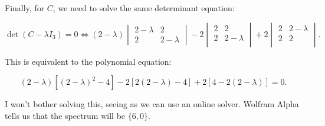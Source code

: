\documentclass{article}
\begin{document}
Finally, for $C$, we need to solve the same determinant equation:

\[
\det(C - \lambda I_3) = 0 \iff (2-\lambda)\begin{vmatrix}
2 - \lambda & 2\\
2 & 2 - \lambda
\end{vmatrix}
-2
\begin{vmatrix}
2 & 2\\
2 & 2 - \lambda\\
\end{vmatrix}
+2
\begin{vmatrix}
2 & 2-\lambda\\
2 & 2\\
\end{vmatrix}.
\]

This is equivalent to the polynomial equation:

\[
(2-\lambda)[(2-\lambda)^{2} - 4] - 2[2(2-\lambda) - 4] + 2[4 - 2(2-\lambda)] = 0.
\]

I won't bother solving this, seeing as we can use an online solver. Wolfram Alpha tells us that the spectrum will be $\{6, 0\}$.
\end{document}
